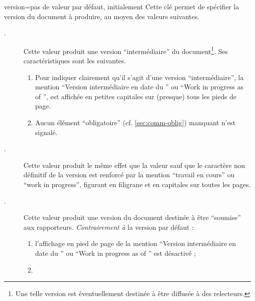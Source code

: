 {
\begin{docKey}{version}{=\textbar{}\textbar{}\textbar{}\textbar{}\textbar{}}{pas
      de valeur par défaut, initialement }
    Cette clé permet de spécifier la version du document à produire, au moyen
    des valeurs suivantes.
    \begin{description}
    \item[.] Cette valeur produit une version
      \enquote{intermédiaire} du document\footnote{Une telle version est
        éventuellement destinée à être diffusée à des relecteurs.}. Ses
      caractéristiques sont les suivantes.
      \begin{enumerate}
      \item\label{item:inprogress:1} Pour indiquer clairement qu'il s'agit
        d'une version \enquote{intermédiaire}, la mention \enquote{Version
          intermédiaire en date du } ou \foreignquote{english}{Work
          in progress as of }\selonlangue{}, est affichée en petites
        capitales sur (presque) tous les pieds de page.
      \item\label{item:inprogress:2} Aucun élément \enquote{obligatoire}
        (cf. \vref{sec:comm-oblig}) manquant n'est signalé.
      \end{enumerate}
    \item[.] Cette valeur produit le même effet que la
      valeur  sauf que le caractère non définitif de la
      version est renforcé par la mention \enquote{travail en cours} ou
      \foreignquote{english}{work in progress}\selonlangue{}, figurant en
      filigrane et en capitales sur toutes les pages.
    \item[.] Cette valeur produit une version du document
      destinée à être \enquote{soumise} aux rapporteurs. \emph{Contrairement à}
      la version par défaut :
      \begin{enumerate}
      \item l'affichage en pied de page de la mention \enquote{Version
          intermédiaire en date du } ou \foreignquote{english}{Work
          in progress as of } est désactivé ;
      \item {}
\end{enumerate}
\end{description}
\end{docKey}}
